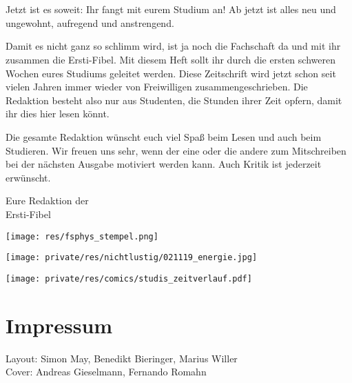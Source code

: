 \section*{\Huge{}}
\begin{multicols*}{2}
Jetzt ist es soweit: Ihr fangt mit eurem Studium an!
Ab jetzt ist alles neu und ungewohnt, aufregend und anstrengend.

Damit es nicht ganz so schlimm wird, ist ja noch die Fachschaft da und mit ihr zusammen die Ersti-Fibel.
Mit diesem Heft sollt ihr durch die ersten schweren Wochen eures Studiums geleitet werden. Diese Zeitschrift wird jetzt schon seit vielen Jahren immer wieder von Freiwilligen zusammengeschrieben.
Die Redaktion besteht also nur aus Studenten, die Stunden ihrer Zeit opfern, damit ihr dies hier lesen könnt.

Die gesamte Redaktion wünscht euch viel Spaß beim Lesen und auch beim Studieren.
Wir freuen uns sehr, wenn der eine oder die andere zum Mitschreiben bei der nächsten Ausgabe motiviert werden kann. Auch Kritik ist jederzeit erwünscht.

Eure Redaktion der\\
Ersti-Fibel

\vspace{-0.75cm}
\hspace{2cm}
\texttt{[image: res/fsphys\_stempel.png]}

\vspace{1.8cm}
\texttt{[image: private/res/nichtlustig/021119\_energie.jpg]}
\vspace{\fill}

\columnbreak

\texttt{[image: private/res/comics/studis\_zeitverlauf.pdf]}

\vspace{-2ex}
\section*{Impressum}
\vspace{-1ex}

{\centering
	\vspace{-1ex}
	\vspace{-1ex}
	\redaktionsleitung
	
	\footnotesize
	Layout: Simon May, Benedikt Bieringer, Marius Willer\\
	Cover: Andreas Gieselmann, Fernando Romahn
	
}
\end{multicols*}
